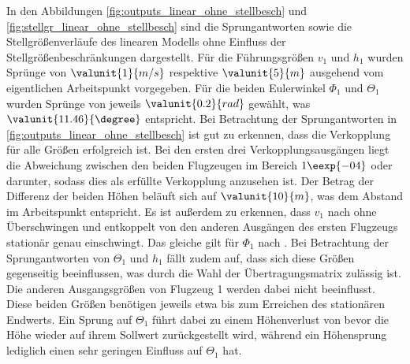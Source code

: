 In den Abbildungen \ref{fig:outputs_linear_ohne_stellbesch} und \ref{fig:stellgr_linear_ohne_stellbesch} sind die Sprungantworten sowie die Stellgrößenverläufe des linearen Modells ohne Einfluss der Stellgrößenbeschränkungen dargestellt. Für die Führungsgrößen $v_1$ und $h_1$ wurden Sprünge von $\valunit{1}{m/s}$ respektive $\valunit{5}{m}$ ausgehend vom eigentlichen Arbeitspunkt vorgegeben. Für die beiden Eulerwinkel $\Phi_1$ und $\Theta_1$ wurden Sprünge von jeweils $\valunit{0.2}{rad}$ gewählt, was $\valunit{11.46}{\degree}$ entspricht. Bei Betrachtung der Sprungantworten in \ref{fig:outputs_linear_ohne_stellbesch} ist gut zu erkennen, dass die Verkopplung für alle Größen erfolgreich ist. Bei den ersten drei Verkopplungsausgängen liegt die Abweichung zwischen den beiden Flugzeugen im Bereich $1\eexp{-04}$ oder darunter, sodass dies als erfüllte Verkopplung anzusehen ist. Der Betrag der Differenz der beiden Höhen beläuft sich auf $\valunit{10}{m}$, was dem Abstand im Arbeitspunkt entspricht. Es ist außerdem zu erkennen, dass $v_1$ nach  ohne Überschwingen und entkoppelt von den anderen Ausgängen des ersten Flugzeugs stationär genau einschwingt. Das gleiche gilt für $\Phi_1$ nach . Bei Betrachtung der Sprungantworten von $\Theta_1$ und $h_1$ fällt zudem auf, dass sich diese Größen gegenseitig beeinflussen, was durch die Wahl der Übertragungsmatrix zulässig ist. Die anderen Ausgangsgrößen von Flugzeug 1 werden dabei nicht beeinflusst. Diese beiden Größen benötigen jeweils etwa  bis zum Erreichen des stationären Endwerts. Ein Sprung auf $\Theta_1$ führt dabei zu einem Höhenverlust von  bevor die Höhe wieder auf ihrem Sollwert zurückgestellt wird, während ein Höhensprung lediglich einen sehr geringen Einfluss auf $\Theta_1$ hat. 

